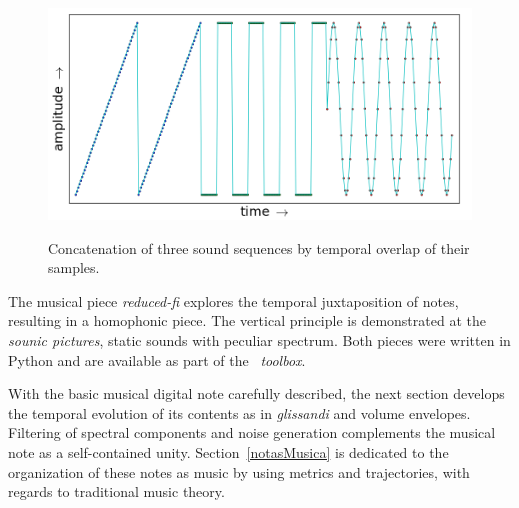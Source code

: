 \begin{figure}[h!]
{    \centering
        \includegraphics[width=.5\columnwidth]{figures/concatenacao__}}
    \caption{Concatenation of three sound sequences by temporal overlap of their samples.}
        \label{fig:concatenacao}
\end{figure}

The musical piece \emph{reduced-fi} explores the temporal juxtaposition of notes, resulting in a homophonic piece. The vertical principle is demonstrated at the \emph{sounic pictures}, static sounds with peculiar spectrum. Both pieces were written in Python and are available as part of the \massa\ \emph{toolbox}.\cite{MASSA}

With the basic musical digital note carefully described, the next section develops the temporal evolution of its contents as in \emph{glissandi} and volume envelopes. Filtering of spectral components and noise generation complements the musical note as a self-contained unity. Section~\ref{notasMusica} is dedicated to the organization of these notes as music by using metrics and trajectories, with regards to traditional music theory.



